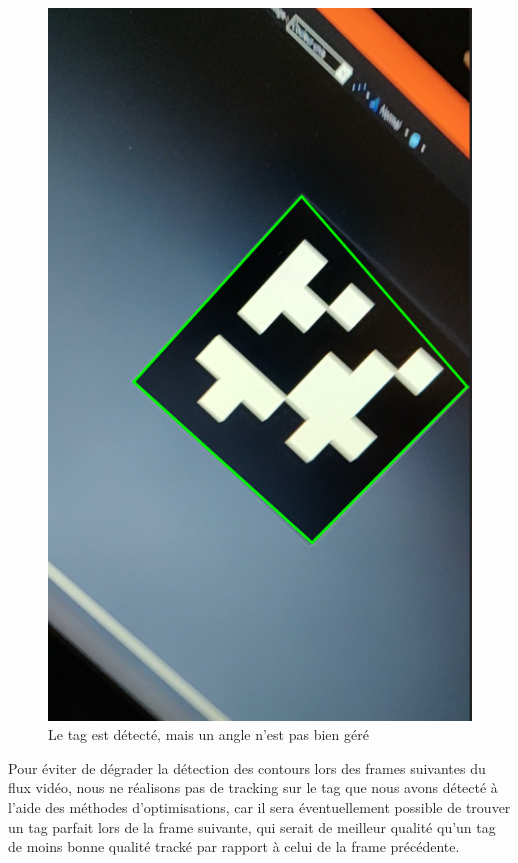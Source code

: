         \begin{figure}[!h]
            \centering
            \includegraphics[scale=0.25]{img/cropped_tag.png}
            \caption{Le tag est détecté, mais un angle n'est pas bien géré}
            \label{fig:cropped_tag}
        \end{figure}

        Pour éviter de dégrader la détection des contours lors des frames suivantes du flux vidéo, nous ne réalisons pas de tracking sur le tag que nous avons détecté à l'aide des méthodes d'optimisations, car il sera éventuellement possible de trouver un tag parfait lors de la frame suivante, qui serait de meilleur qualité qu'un tag de moins bonne qualité tracké par rapport à celui de la frame précédente.

